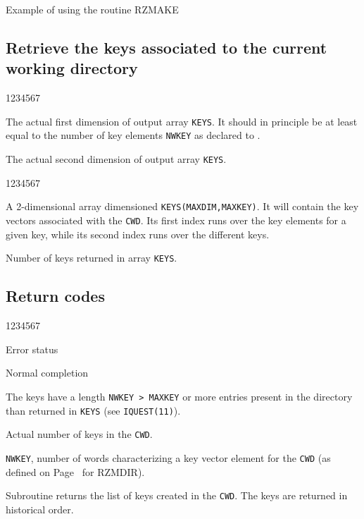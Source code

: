 \begin{XMPt}{Example of using the routine RZMAKE}
\subsection{Retrieve the keys associated to the current working directory}
\Idesc
\begin{DLtt}{1234567}
\item[MAXDIM]The actual first dimension of output array {\tt KEYS}.
It should in principle be at least equal to the number of key elements
{\tt NWKEY} as declared to .
\item[MAXKEY]The actual second dimension of output array {\tt KEYS}.
\end{DLtt}
\Odesc
\begin{DLtt}{1234567}
\item[KEYS*]A 2-dimensional array dimensioned {\tt KEYS(MAXDIM,MAXKEY)}.
It will contain the key vectors associated with the {\tt CWD}.
\newline Its first index runs over the key elements for a given key, while
its second index runs over the different keys.
\item[NKEYS*]Number of keys returned in array {\tt KEYS}.
\end{DLtt}
\subsection{Return codes}
\begin{DLtt}{1234567}
\item[IQUEST(1)]Error status
\begin{DLtt}{12}
\item[0]Normal completion
\item[1]The keys have a length {\tt NWKEY > MAXKEY}
\newline  or more entries present in the directory than returned in {\tt KEYS}
(see {\tt IQUEST(11)}).
\end{DLtt}
\par
\item[IQUEST(11)]Actual number of keys in the {\tt CWD}.
\item[IQUEST(12)]{\tt NWKEY}, number of words characterizing a key vector
element for the {\tt CWD} (as defined on Page~\pageref{SR_RZMDIR} for RZMDIR).
\end{DLtt}
\par 
Subroutine  returns the list of keys created in the
{\tt CWD}. The keys are returned in historical order.

\end{XMPt}
